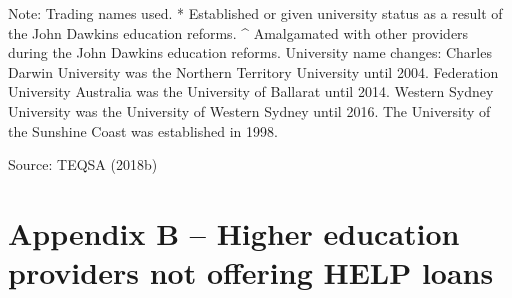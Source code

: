 \documentclass{grattan}
\begin{document}

Note: Trading names used. * Established or given university status as a result of the John Dawkins education reforms. \^{} Amalgamated with other providers during the John Dawkins education reforms. University name changes: Charles Darwin University was the Northern Territory University until 2004. Federation University Australia was the University of Ballarat until 2014. Western Sydney University was the University of Western Sydney until 2016. The University of the Sunshine Coast was established in 1998.

Source: TEQSA (2018b)

%
\chapter{Appendix B -- Higher education providers not offering HELP loans}\label{chap:appendix-b-higher-education-providers-not-offering-help-loans}
\end{document}
